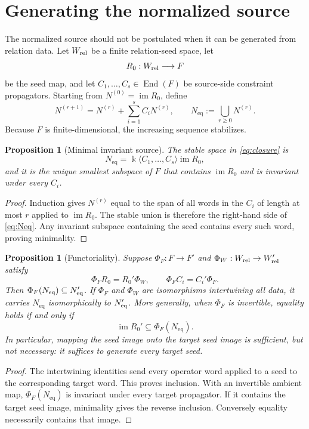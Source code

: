 \documentclass[11pt]{amsart}
\newtheorem{proposition}[theorem]{Proposition}
\theoremstyle{definition}
\newcommand{\kk}{\Bbbk}
\newcommand{\im}{\operatorname{im}}
\newcommand{\End}{\operatorname{End}}
\newcommand{\Neq}{N_{\mathrm{eq}}}
\begin{document}
\section{Generating the normalized source}

The normalized source should not be postulated when it can be generated from relation data. Let
\(W_{\rm rel}\) be a finite relation-seed space, let
\[
R_0:W_{\rm rel}\longrightarrow F
\]
be the seed map, and let \(C_1,\ldots,C_s\in\End(F)\) be source-side constraint propagators.
Starting from \(N^{(0)}=\im R_0\), define
\begin{equation}
N^{(r+1)}=N^{(r)}+\sum_{i=1}^s C_iN^{(r)},
\qquad
\Neq:=\bigcup_{r\geq 0}N^{(r)}.
\label{eq:closure}
\end{equation}
Because \(F\) is finite-dimensional, the increasing sequence stabilizes.

\begin{proposition}[Minimal invariant source]
The stable space in \eqref{eq:closure} is
\begin{equation}
\Neq=\kk\langle C_1,\ldots,C_s\rangle\im R_0,
\label{eq:Neq}
\end{equation}
and it is the unique smallest subspace of \(F\) that contains \(\im R_0\) and is invariant under
every \(C_i\).
\end{proposition}

\begin{proof}
Induction gives \(N^{(r)}\) equal to the span of all words in the \(C_i\) of length at most
\(r\) applied to \(\im R_0\). The stable union is therefore the right-hand side of
\eqref{eq:Neq}. Any invariant subspace containing the seed contains every such word, proving
minimality.
\end{proof}

\begin{proposition}[Functoriality]
Suppose \(\Phi_F:F\to F'\) and \(\Phi_W:W_{\rm rel}\to W'_{\rm rel}\) satisfy
\[
\Phi_FR_0=R_0'\Phi_W,
\qquad
\Phi_FC_i=C_i'\Phi_F.
\]
Then \(\Phi_F(\Neq)\subseteq N_{\rm eq}'\). If \(\Phi_F\) and \(\Phi_W\) are isomorphisms intertwining all
data, it carries \(\Neq\) isomorphically to \(N_{\rm eq}'\).
More generally, when \(\Phi_F\) is invertible, equality holds if and only if
\[
\im R_0'\subseteq\Phi_F(\Neq).
\]
In particular, mapping the seed image onto the target seed image is sufficient,
but not necessary: it suffices to generate every target seed.
\end{proposition}
\begin{proof}
The intertwining identities send every operator word applied to a seed to the
corresponding target word. This proves inclusion. With an invertible ambient map, \(\Phi_F(\Neq)\) is invariant
under every target propagator. If it contains the target seed image, minimality
gives the reverse inclusion. Conversely equality necessarily contains that image.
\end{proof}
\end{document}
